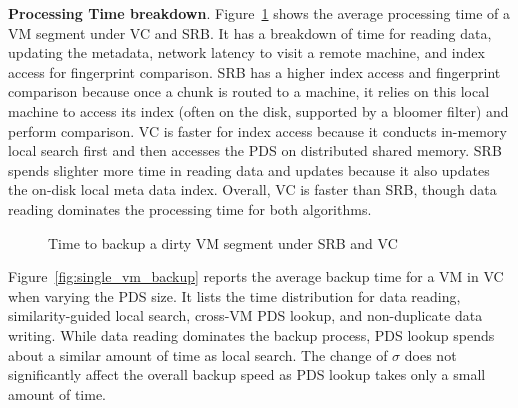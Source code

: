 {\bf Processing Time breakdown}.
Figure~\ref{fig:srb_vs_vc} shows
the  average  processing  time of  a VM segment under VC and SRB. 
It has a breakdown of time for reading data, updating the metadata, network latency to visit
a remote machine, and index access for fingerprint comparison.
SRB has a higher index access and fingerprint comparison because once a chunk is routed to a machine,
it relies on this local machine to access its index (often on the disk, supported by a bloomer filter) 
and perform comparison.
VC is faster for index access because it conducts in-memory local search first and then
accesses  the PDS on distributed shared memory.  
SRB spends  slighter more time in  reading data and updates because it also updates the on-disk
local meta data index.
Overall,  VC is faster than SRB, though data reading dominates the processing time for both algorithms.


\begin{figure}[htbp]
  \centering
  \caption{Time to backup a dirty VM segment under SRB and VC}
  \label{fig:srb_vs_vc}
\end{figure}

Figure~\ref{fig:single_vm_backup} reports the average backup time for a VM in VC when
varying the PDS size.  It lists the time distribution for data reading,
similarity-guided local search, cross-VM PDS lookup, and non-duplicate data writing. 
While data reading dominates the backup process, PDS lookup spends about a similar amount
of time as local search.
The change of $\sigma$ does not significantly affect the overall backup speed as
PDS lookup takes only a small amount of time.



